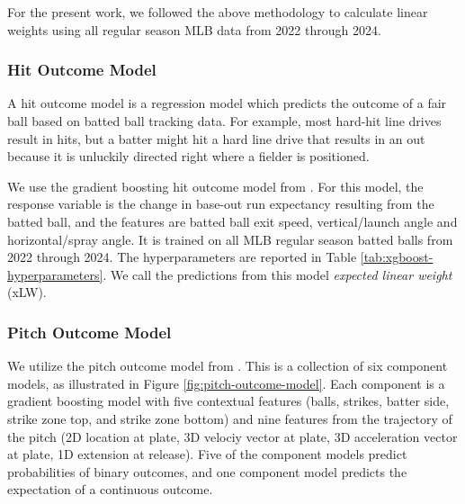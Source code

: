 \documentclass{article}
\begin{document}
        For the present work, we followed the above methodology to calculate linear weights using all regular season MLB data from 2022 through 2024.
      
      \subsubsection{Hit Outcome Model}
      \label{sec:hit-outcome-model}

        A hit outcome model is a regression model which predicts the outcome of a fair ball based on batted ball tracking data. For example, most hard-hit line drives result in hits, but a batter might hit a hard line drive that results in an out because it is unluckily directed right where a fielder is positioned.

        We use the gradient boosting hit outcome model from \textcite{powers_pitch_2023}. For this model, the response variable is the change in base-out run expectancy resulting from the batted ball, and the features are batted ball exit speed, vertical/launch angle and horizontal/spray angle. It is trained on all MLB regular season batted balls from 2022 through 2024. The hyperparameters are reported in Table \ref{tab:xgboost-hyperparameters}. We call the predictions from this model {\it expected linear weight} (xLW).

      \subsubsection{Pitch Outcome Model}
      \label{sec:pitch-outcome-model}

        We utilize the pitch outcome model from \textcite{powers_pitch_2023}. This is a collection of six component models, as illustrated in Figure \ref{fig:pitch-outcome-model}. Each component is a gradient boosting model with five contextual features (balls, strikes, batter side, strike zone top, and strike zone bottom) and nine features from the trajectory of the pitch (2D location at plate, 3D velociy vector at plate, 3D acceleration vector at plate, 1D extension at release). Five of the component models predict probabilities of binary outcomes, and one component model predicts the expectation of a continuous outcome.
\end{document}
